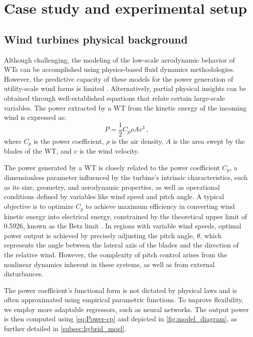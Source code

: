 \documentclass[preprint,12pt]{elsarticle}
\begin{document}
\section{Case study and experimental setup}\label{sec:case-study}

\subsection{Wind turbines physical background}
Although challenging, the modeling of the low-scale aerodynamic behavior of WTs can be accomplished using physics-based fluid dynamics methodologies. However, the predictive capacity of these models for the power generation of utility-scale wind farms is limited \cite{Howland2019}. Alternatively, partial physical insights can be obtained through well-established equations that relate certain large-scale variables. The power extracted by a WT from the kinetic energy of the incoming wind is expressed as:
\begin{equation}\label{eq:Power-cp}
    P = \frac{1}{2} C_{p} \rho A v^3\,,
\end{equation}
where $C_p$ is the power coefficient, $\rho$ is the air density, $A$ is the area swept by the blades of the WT, and $v$ is the wind velocity.

The power generated by a WT is closely related to the power coefficient $C_p$, a dimensionless parameter influenced by the turbine's intrinsic characteristics, such as its size, geometry, and aerodynamic properties, as well as operational conditions defined by variables like wind speed and pitch angle. A typical objective is to optimize $C_p$ to achieve maximum efficiency in converting wind kinetic energy into electrical energy, constrained by the theoretical upper limit of 0.5926, known as the Betz limit \cite{Betz1}. In regions with variable wind speeds, optimal power output is achieved by precisely adjusting the pitch angle, $\theta$, which represents the angle between the lateral axis of the blades and the direction of the relative wind. However, the complexity of pitch control arises from the nonlinear dynamics inherent in these systems, as well as from external disturbances.

The power coefficient's functional form is not dictated by physical laws and is often approximated using empirical parametric functions. To improve flexibility, we employ more adaptable regressors, such as neural networks. The output power is then computed using \autoref{eq:Power-cp} and depicted in \autoref{fig:model_diagram}, as further detailed in \autoref{subsec:hybrid_moel}. 
\end{document}
